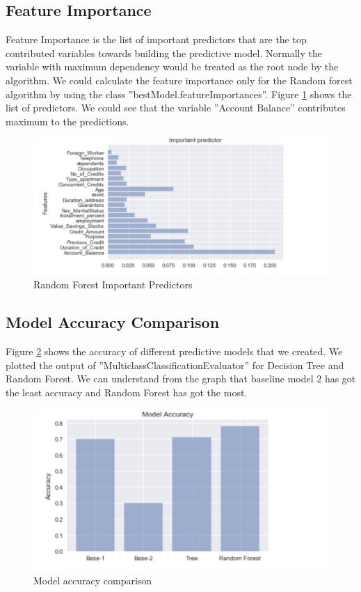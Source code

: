 \documentclass[sigconf]{acmart}
\begin{document}
\subsection{Feature Importance} 

Feature Importance is the list of important predictors that are the top contributed variables towards building the predictive model. Normally the variable with maximum dependency would be treated as the root node by the algorithm. We could calculate the feature importance only for the Random forest algorithm by using the class ''bestModel.featureImportances''. Figure \ref{fig:Figure14} shows the list of predictors. We could see that the variable ''Account Balance'' contributes maximum to the predictions. 

\begin{figure}[htb]
  \centering
  \includegraphics[width=1.0\columnwidth]{images/Figure14.png}
  \caption{Random Forest Important Predictors}
  \label{fig:Figure14} 
\end{figure}

\subsection{Model Accuracy Comparison} 

Figure \ref{fig:Figure15} shows the accuracy of different predictive models that we created. We plotted the output of ''MulticlassClassificationEvaluator'' for Decision Tree and Random Forest. We can understand from the graph that baseline model 2 has got the least accuracy and Random Forest has got the most. 

\begin{figure}[htb]
  \centering
  \includegraphics[width=1.0\columnwidth]{images/Figure15.png}
  \caption{Model accuracy comparison
  \cite{german-credit-sri-sai}}
  \label{fig:Figure15} 
\end{figure}
\end{document}
